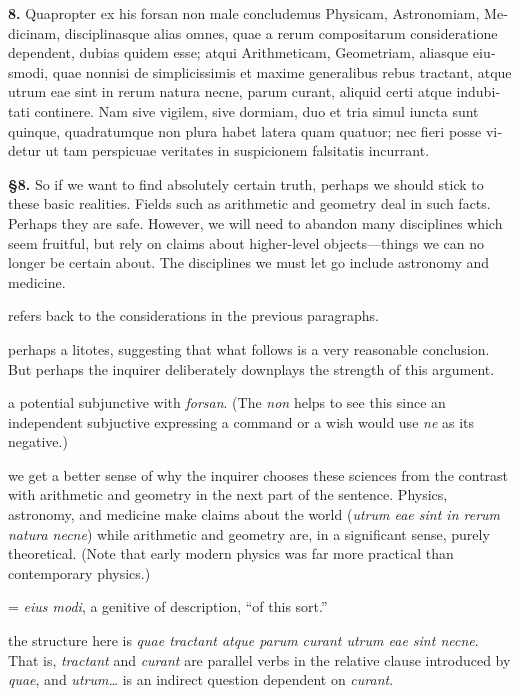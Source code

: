\beginnumbering
\pstart
\begin{latin}
    \textenglish{\textbf{8.}} Quapropter ex his forsan non male concludemus Physicam, Astronomiam, Medicinam, disciplinasque alias omnes, quae a rerum compositarum consideratione dependent, dubias quidem esse; atqui Arithmeticam, Geometriam, aliasque eiusmodi, quae nonnisi de simplicissimis et maxime generalibus rebus tractant, atque utrum eae sint in rerum natura necne, parum curant, aliquid certi atque indubitati continere. Nam sive vigilem, sive dormiam, duo et tria simul iuncta sunt quinque, quadratumque non plura habet latera quam quatuor; nec fieri posse videtur ut tam perspicuae veritates in suspicionem falsitatis incurrant.
\end{latin}
\pend
\endnumbering

\prenotes

\textbf{§8.} So if we want to find absolutely certain truth, perhaps we should stick to these basic realities. Fields such as arithmetic and geometry deal in such facts. Perhaps they are safe. However, we will need to abandon many disciplines which seem fruitful, but rely on claims about higher-level objects---things we can no longer be certain about. The disciplines we must let go include astronomy and medicine.

 refers back to the considerations in the previous paragraphs.

 perhaps a litotes, suggesting that what follows is a very reasonable conclusion. But perhaps the inquirer deliberately downplays the strength of this argument.

 a potential subjunctive with \textit{forsan}. (The \textit{non} helps to see this since an independent subjuctive expressing a command or a wish would use \textit{ne} as its negative.)

 we get a better sense of why the inquirer chooses these sciences from the contrast with arithmetic and geometry in the next part of the sentence. Physics, astronomy, and medicine make claims about the world (\textit{utrum eae sint in rerum natura necne}) while arithmetic and geometry are, in a significant sense, purely theoretical. (Note that early modern physics was far more practical than contemporary physics.)

 = \textit{eius modi}, a genitive of description, ``of this sort.''

 the structure here is \textit{quae tractant atque parum curant utrum eae sint necne}. That is, \textit{tractant} and \textit{curant} are parallel verbs in the relative clause introduced by \textit{quae}, and \textit{utrum\dots} is an indirect question dependent on \textit{curant}.

